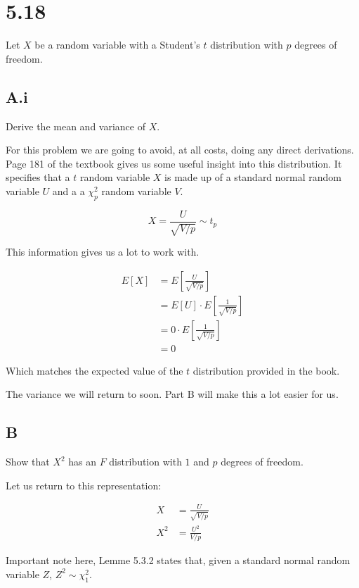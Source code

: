 \section{5.18}

Let $X$ be a random variable with a Student's $t$ distribution with $p$ degrees of freedom.

\subsection*{A.i}

Derive the mean and variance of $X$.

For this problem we are going to avoid, at all costs, doing any direct derivations. Page 181 of the textbook gives us some useful insight into this distribution. It specifies that a $t$ random variable $X$ is made up of a standard normal random variable $U$ and a a $\chi^2_p$ random variable $V$. 

\[X = \frac{U}{\sqrt{V/p}} \sim t_p\]

This information gives us a lot to work with. 

\begin{align*}
	E[X] &= E\left[ \frac{U}{\sqrt{V/p}}  \right] \\
	&= E[U] \cdot E\left[ \frac{1}{\sqrt{V/p}} \right] \\
	&= 0 \cdot E\left[ \frac{1}{\sqrt{V/p}} \right] \\
	&= 0
\end{align*}

Which matches the expected value of the $t$ distribution provided in the book.

The variance we will return to soon. Part B will make this a lot easier for us. 

\subsection*{B}

Show that $X^2$ has an $F$ distribution with $1$ and $p$ degrees of freedom.

Let us return to this representation:

\vspace{-4mm}
\begin{align*}
	X &= \frac{U}{\sqrt{V/p}} \\
	X^2 &= \frac{U^2}{V/p}
\end{align*}

Important note here, Lemme 5.3.2 states that, given a standard normal random variable $Z$, $Z^2 \sim \chi^2_1$.

